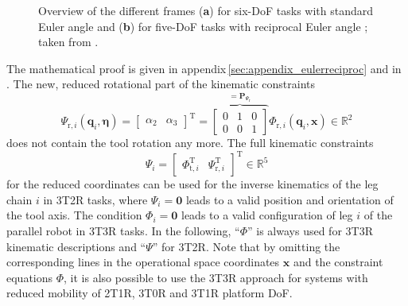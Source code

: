 \documentclass[robotics,article,accept,moreauthors,pdftex]{Definitions/mdpi}
\newcommand{\bm}[1]{\boldsymbol{#1}}
\newcommand{\transp}[0]{{\mathrm{T}}}
\let\Phi\varPhi
\let\Psi\varPsi
\begin{document}
\begin{figure}[H]
    
    \caption{Overview of the different frames (\textbf{a}) for six-DoF tasks with standard Euler angle  and (\textbf{b}) for five-DoF tasks with reciprocal Euler angle ; taken from \cite{1_SchapplerTapOrt2019}.}
    \label{fig:frames_5dof_6dof}
\end{figure} 

The mathematical proof is given in appendix\,\ref{sec:appendix_eulerreciproc} and in \cite{1_SchapplerTapOrt2019}.
%
The new, reduced rotational part of the kinematic constraints
%
\begin{equation}
\bm{\Psi}_{\mathrm{r},i}(\bm{q}_i,\bm{\eta}) = 
\begin{bmatrix}
\alpha_2 & \alpha_3
\end{bmatrix}^\transp
=
\overbrace{\begin{bmatrix}
    0 & 1 & 0 \\ 
    0 & 0 & 1
    \end{bmatrix}}^{=\bm{P}_{\bm{\Psi}_\mathrm{r}}}
\bm{\Phi}_{\mathrm{r},i} (\bm{q}_i,\bm{x})
\in {\mathbb{R}}^{2}
\label{equ:Psir_def}
\end{equation}
%
does not contain the tool rotation any more.
The full kinematic constraints
%
\begin{equation}
\bm{\Psi}_i=\begin{bmatrix}
\bm{\Phi}_{\mathrm{t},i}^\transp & \bm{\Psi}_{\mathrm{r},i}^\transp
\end{bmatrix}^\transp \in {\mathbb{R}}^{5}
\label{equ:Psi_def}
\end{equation}
%
for the reduced coordinates can be used for the inverse kinematics of the leg chain $i$ in 3T2R tasks, where $\bm{\Psi}_i=\bm{0}$ leads to a valid position and orientation of the tool axis.
The condition $\bm{\Phi}_i=\bm{0}$ leads to a valid configuration of leg $i$ of the parallel robot in 3T3R tasks.
In the following, ``$\bm{\Phi}$'' is always used for 3T3R kinematic descriptions and ``$\bm{\Psi}$'' for 3T2R.
Note that by omitting the corresponding lines in the operational space coordinates $\bm{x}$ and the constraint equations $\bm{\Phi}$, it is also possible to use the 3T3R approach for systems with reduced mobility of 2T1R, 3T0R and 3T1R platform DoF.


\end{document}

